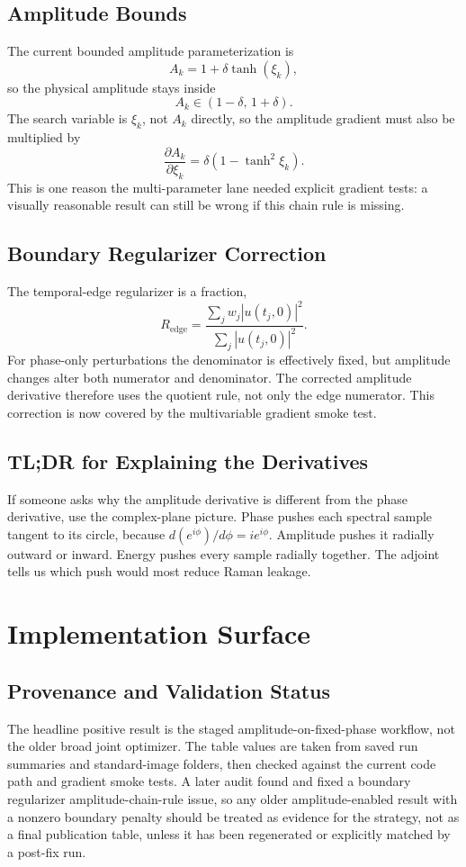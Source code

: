\documentclass[11pt]{article}
\newcommand{\Avar}{A}
\begin{document}
\subsection*{Amplitude Bounds}
The current bounded amplitude parameterization is
\[
    \Avar_k = 1+\delta\tanh(\xi_k),
\]
so the physical amplitude stays inside
\[
    \Avar_k \in (1-\delta,\,1+\delta).
\]
The search variable is $\xi_k$, not $\Avar_k$ directly, so the amplitude gradient must also be multiplied by
\[
    \frac{\partial \Avar_k}{\partial \xi_k}
    =
    \delta\left(1-\tanh^2\xi_k\right).
\]
This is one reason the multi-parameter lane needed explicit gradient tests: a visually reasonable result can still be wrong if this chain rule is missing.

\subsection*{Boundary Regularizer Correction}
The temporal-edge regularizer is a fraction,
\[
    R_{\mathrm{edge}}=
    \frac{\sum_j w_j |u(t_j,0)|^2}{\sum_j |u(t_j,0)|^2}.
\]
For phase-only perturbations the denominator is effectively fixed, but amplitude changes alter both numerator and denominator. The corrected amplitude derivative therefore uses the quotient rule, not only the edge numerator. This correction is now covered by the multivariable gradient smoke test.

\subsection*{TL;DR for Explaining the Derivatives}
If someone asks why the amplitude derivative is different from the phase derivative, use the complex-plane picture. Phase pushes each spectral sample tangent to its circle, because $d(e^{i\phi})/d\phi=i e^{i\phi}$. Amplitude pushes it radially outward or inward. Energy pushes every sample radially together. The adjoint tells us which push would most reduce Raman leakage.

\section{Implementation Surface}

\subsection*{Provenance and Validation Status}

The headline positive result is the staged amplitude-on-fixed-phase workflow,
not the older broad joint optimizer. The table values are taken from saved run
summaries and standard-image folders, then checked against the current code
path and gradient smoke tests. A later audit found and fixed a boundary
regularizer amplitude-chain-rule issue, so any older amplitude-enabled result
with a nonzero boundary penalty should be treated as evidence for the strategy,
not as a final publication table, unless it has been regenerated or explicitly
matched by a post-fix run.
\end{document}
